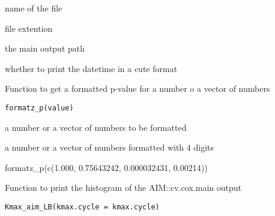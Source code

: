 \documentclass[a4paper]{book}
\begin{document}
%
\begin{Arguments}
\begin{ldescription}
\item[\code{filename}] name of the file

\item[\code{extention}] file extention

\item[\code{output}] the main output path

\item[\code{datetime}] whether to print the datetime in a cute format
\end{ldescription}
\end{Arguments}
%
\begin{Description}
Function to get a formatted p-value for a number o a vector of numbers
\end{Description}
%
\begin{Usage}
\begin{verbatim}
formatz_p(value)
\end{verbatim}
\end{Usage}
%
\begin{Arguments}
\begin{ldescription}
\item[\code{value}] a number or a vector of numbers to be formatted
\end{ldescription}
\end{Arguments}
%
\begin{Value}
a number or a vector of numbers formatted with 4 digits
\end{Value}
%
\begin{Examples}
\begin{ExampleCode}
formatz_p(c(1.000, 0.75643242, 0.000032431, 0.00214))

\end{ExampleCode}
\end{Examples}
%
\begin{Description}
Function to print the histogram of the AIM::cv.cox.main output
\end{Description}
%
\begin{Usage}
\begin{verbatim}
Kmax_aim_LB(kmax.cycle = kmax.cycle)
\end{verbatim}
\end{Usage}
\end{document}
